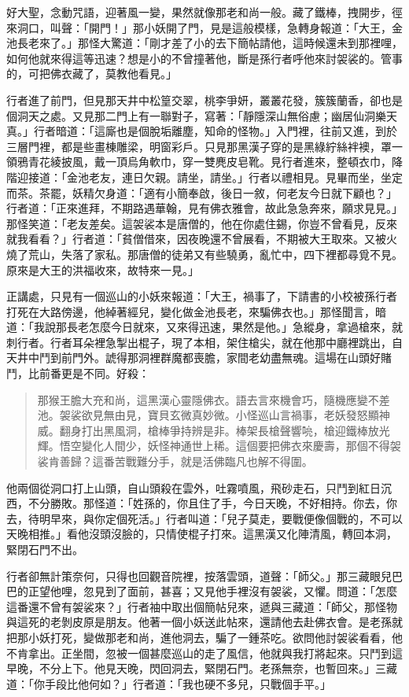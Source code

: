 好大聖，念動咒語，迎著風一變，果然就像那老和尚一般。藏了鐵棒，拽開步，徑來洞口，叫聲：「開門！」那小妖開了門，見是這般模樣，急轉身報道：「大王，金池長老來了。」那怪大驚道：「剛才差了小的去下簡帖請他，這時候還未到那裡哩，如何他就來得這等迅速？想是小的不曾撞著他，斷是孫行者呼他來討袈裟的。管事的，可把佛衣藏了，莫教他看見。」

行者進了前門，但見那天井中松篁交翠，桃李爭妍，叢叢花發，簇簇蘭香，卻也是個洞天之處。又見那二門上有一聯對子，寫著：「靜隱深山無俗慮；幽居仙洞樂天真。」行者暗道：「這廝也是個脫垢離塵，知命的怪物。」入門裡，往前又進，到於三層門裡，都是些畫棟雕梁，明窗彩戶。只見那黑漢子穿的是黑綠紵絲袢襖，罩一領鴉青花綾披風，戴一頂烏角軟巾，穿一雙麂皮皂靴。見行者進來，整頓衣巾，降階迎接道：「金池老友，連日欠親。請坐，請坐。」行者以禮相見。見畢而坐，坐定而茶。茶罷，妖精欠身道：「適有小簡奉啟，後日一敘，何老友今日就下顧也？」行者道：「正來進拜，不期路遇華翰，見有佛衣雅會，故此急急奔來，願求見見。」那怪笑道：「老友差矣。這袈裟本是唐僧的，他在你處住錫，你豈不曾看見，反來就我看看？」行者道：「貧僧借來，因夜晚還不曾展看，不期被大王取來。又被火燒了荒山，失落了家私。那唐僧的徒弟又有些驍勇，亂忙中，四下裡都尋覓不見。原來是大王的洪福收來，故特來一見。」

正講處，只見有一個巡山的小妖來報道：「大王，禍事了，下請書的小校被孫行者打死在大路傍邊，他綽著經兒，變化做金池長老，來騙佛衣也。」那怪聞言，暗道：「我說那長老怎麼今日就來，又來得迅速，果然是他。」急縱身，拿過槍來，就刺行者。行者耳朵裡急掣出棍子，現了本相，架住槍尖，就在他那中廳裡跳出，自天井中鬥到前門外。諕得那洞裡群魔都喪膽，家間老幼盡無魂。這場在山頭好賭鬥，比前番更是不同。好殺：
\begin{quote}
那猴王膽大充和尚，這黑漢心靈隱佛衣。語去言來機會巧，隨機應變不差池。袈裟欲見無由見，寶貝玄微真妙微。小怪巡山言禍事，老妖發怒顯神威。翻身打出黑風洞，槍棒爭持辨是非。棒架長槍聲響喨，槍迎鐵棒放光輝。悟空變化人間少，妖怪神通世上稀。這個要把佛衣來慶壽，那個不得袈裟肯善歸？這番苦戰難分手，就是活佛臨凡也解不得圍。
\end{quote}

他兩個從洞口打上山頭，自山頭殺在雲外，吐霧噴風，飛砂走石，只鬥到紅日沉西，不分勝敗。那怪道：「姓孫的，你且住了手，今日天晚，不好相持。你去，你去，待明早來，與你定個死活。」行者叫道：「兒子莫走，要戰便像個戰的，不可以天晚相推。」看他沒頭沒臉的，只情使棍子打來。這黑漢又化陣清風，轉回本洞，緊閉石門不出。

行者卻無計策奈何，只得也回觀音院裡，按落雲頭，道聲：「師父。」那三藏眼兒巴巴的正望他哩，忽見到了面前，甚喜；又見他手裡沒有袈裟，又懼。問道：「怎麼這番還不曾有袈裟來？」行者袖中取出個簡帖兒來，遞與三藏道：「師父，那怪物與這死的老剝皮原是朋友。他著一個小妖送此帖來，還請他去赴佛衣會。是老孫就把那小妖打死，變做那老和尚，進他洞去，騙了一鍾茶吃。欲問他討袈裟看看，他不肯拿出。正坐間，忽被一個甚麼巡山的走了風信，他就與我打將起來。只鬥到這早晚，不分上下。他見天晚，閃回洞去，緊閉石門。老孫無奈，也暫回來。」三藏道：「你手段比他何如？」行者道：「我也硬不多兒，只戰個手平。」

